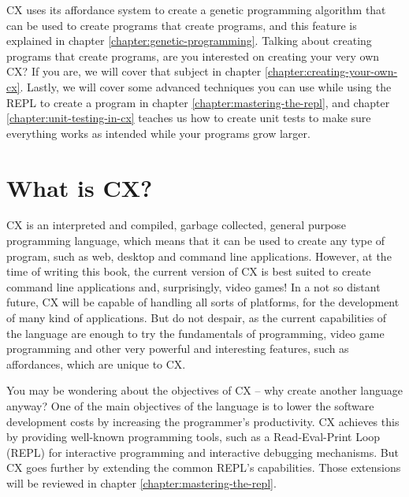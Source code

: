 \documentclass[11pt,fleqn,openany]{book} %
\begin{document}
CX uses its affordance system to create a genetic programming algorithm that can be used to create programs that create programs, and this feature is explained in chapter \ref{chapter:genetic-programming}. Talking about creating programs that create programs, are you interested on creating your very own CX? If you are, we will cover that subject in chapter \ref{chapter:creating-your-own-cx}. Lastly, we will cover some advanced techniques you can use while using the REPL to create a program in chapter \ref{chapter:mastering-the-repl}, and chapter \ref{chapter:unit-testing-in-cx} teaches us how to create unit tests to make sure everything works as intended while your programs grow larger.

\section{What is CX?}


CX is an interpreted and compiled, garbage collected, general purpose programming language, which means that it can be used to create any type of program, such as web, desktop and command line applications. However, at the time of writing this book, the current version of CX is best suited to create command line applications and, surprisingly, video games! In a not so distant future, CX will be capable of handling all sorts of platforms, for the development of many kind of applications. But do not despair, as the current capabilities of the language are enough to try the fundamentals of programming, video game programming and other very powerful and interesting features, such as affordances, which are unique to CX.

You may be wondering about the objectives of CX -- why create another language anyway? One of the main objectives of the language is to lower the software development costs by increasing the programmer's productivity. CX achieves this by providing well-known programming tools, such as a Read-Eval-Print Loop (REPL) for interactive programming and interactive debugging mechanisms. But CX goes further by extending the common REPL's capabilities. Those extensions will be reviewed in chapter \ref{chapter:mastering-the-repl}.
\end{document}
